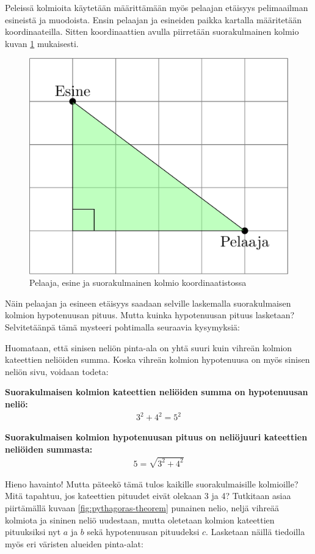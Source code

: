 \documentclass[
]{book}
\theoremstyle{definition}
\theoremstyle{definition}
\theoremstyle{definition}
\theoremstyle{definition}
\theoremstyle{remark}
\begin{document}
Peleissä kolmioita käytetään määrittämään myös pelaajan etäisyys pelimaailman esineistä ja muodoista. Ensin pelaajan ja esineiden paikka kartalla määritetään koordinaateilla. Sitten koordinaattien avulla piirretään suorakulmainen kolmio kuvan \ref{fig:pelaaja-esine-kolmio} mukaisesti.

\begin{figure}

{\centering \includegraphics[width=0.4\linewidth,height=0.4\textheight]{img/pelaaja-esine} 

}

\caption{Pelaaja, esine ja suorakulmainen kolmio koordinaatistossa}\label{fig:pelaaja-esine-kolmio}
\end{figure}

Näin pelaajan ja esineen etäisyys saadaan selville laskemalla suorakulmaisen kolmion hypotenuusan pituus. Mutta kuinka hypotenuusan pituus lasketaan? Selvitetäänpä tämä mysteeri pohtimalla seuraavia kysymyksiä:

Huomataan, että sinisen neliön pinta-ala on yhtä suuri kuin vihreän kolmion kateettien neliöiden summa. Koska vihreän kolmion hypotenuusa on myös sinisen neliön sivu, voidaan todeta:

\textbf{Suorakulmaisen kolmion kateettien neliöiden summa on hypotenuusan neliö:}
\begin{align*}
  3^2+4^2=5^2
\end{align*}

\textbf{Suorakulmaisen kolmion hypotenuusan pituus on neliöjuuri kateettien neliöiden summasta:}
\begin{align*}
  5=\sqrt{3^2+4^2}
\end{align*}

Hieno havainto! Mutta päteekö tämä tulos kaikille suorakulmaisille kolmioille? Mitä tapahtuu, jos kateettien pituudet eivät olekaan 3 ja 4? Tutkitaan asiaa piirtämällä kuvaan \ref{fig:pythagoras-theorem} punainen nelio, neljä vihreää kolmiota ja sininen neliö uudestaan, mutta oletetaan kolmion kateettien pituuksiksi nyt \(a\) ja \(b\) sekä hypotenuusan pituudeksi \(c\). Lasketaan näillä tiedoilla myös eri väristen alueiden pinta-alat:
\end{document}

